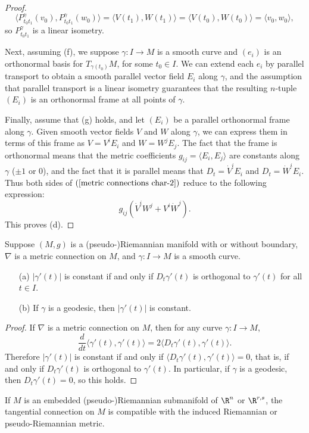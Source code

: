 \begin{proof}
\[\langle P^\gamma_{t_0t_1}(v_0),P^\gamma_{t_0t_1}(w_0)\rangle=\langle V(t_1),W(t_1)\rangle=\langle V(t_0),W(t_0)\rangle=\langle v_0,w_0\rangle,\]
so $P^\gamma_{t_0t_1}$ is a linear isometry.\par
Next, assuming (f), we suppose $\gamma:I\to M$ is a smooth curve and $(e_i)$ is an orthonormal basis for $T_{\gamma(t_0)}M$, for some $t_0\in I$. We can extend each 
$e_i$ by parallel transport to obtain a smooth parallel vector field $E_i$ along $\gamma$, and the assumption that parallel transport is a linear isometry guarantees that the 
resulting $n$-tuple $(E_i)$ is an orthonormal frame at all points of $\gamma$.\par
Finally, assume that (g) holds, and let $(E_i)$ be a parallel orthonormal frame along $\gamma$. Given smooth vector fields $V$ and $W$ along $\gamma$, we can express 
them in terms of this frame as $V=V^iE_i$ and $W=W^jE_j$. The fact that the frame is orthonormal means that the metric coefficients $g_{ij}=\langle E_i,E_j\rangle$ are 
constants along $\gamma$ ($\pm 1$ or $0$), and the fact that it is parallel means that $D_t=\dot{V}^iE_i$ and $D_t=\dot{W}^iE_i$. Thus both sides of $(\ref{metric connections char-2})$ 
reduce to the following expression:
\[g_{ij}(\dot{V}^iW^j+V^i\dot{W}^j).\]
This proves (d).
\end{proof}
\begin{corollary}\label{metric connection geodesic velocity constant}
Suppose $(M,g)$ is a (pseudo-)Riemannian manifold with or without boundary, $\nabla$ is a metric connection on $M$, and $\gamma:I\to M$ is a smooth curve.
\begin{itemize}
\item[(a)] $|\gamma'(t)|$ is constant if and only if $D_t\gamma'(t)$ is orthogonal to $\gamma'(t)$ for all $t\in I$.
\item[(b)] If $\gamma$ is a geodesic, then $|\gamma'(t)|$ is constant. 
\end{itemize}
\end{corollary}
\begin{proof}
If $\nabla$ is a metric connection on $M$, then for any curve $\gamma:I\to M$,
\[\frac{d}{dt}\langle\gamma'(t),\gamma'(t)\rangle=2\langle D_t\gamma'(t),\gamma'(t)\rangle.\]
Therefore $|\gamma'(t)|$ is constant if and only if $\langle D_t\gamma'(t),\gamma'(t)\rangle=0$, that is, if and only if $D_t\gamma'(t)$ is orthogonal to $\gamma'(t)$. In 
particular, if $\gamma$ is a geodesic, then $D_t\gamma'(t)=0$, so this holds.
\end{proof}
\begin{proposition}\label{Euclidean tangential connection metric}
If $M$ is an embedded (pseudo-)Riemannian submanifold of $\R^n$ or $\R^{r,s}$, the tangential connection on $M$ is compatible with the induced Riemannian or 
pseudo-Riemannian metric.
\end{proposition}
